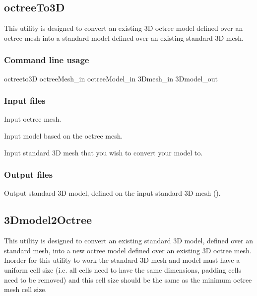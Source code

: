 \subsection{octreeTo3D}

This utility is designed to convert an existing 3D octree model defined over an octree mesh into a standard model defined over an existing standard 3D mesh.


\subsubsection{Command line usage}
\begin{fileExample}
octreeto3D octreeMesh\_in octreeModel\_in 3Dmesh\_in 3Dmodel\_out
\end{fileExample}

\subsubsection{Input files}
\begin{description}[leftmargin=5cm, style=sameline, align=left]
\item[\fileName{octreeMesh\_in}] Input octree mesh.
\item[\fileName{octreeModel\_in}] Input model based on the octree mesh.
\item[\fileName{3Dmesh\_in}] Input standard 3D mesh that you wish to convert your model to.
\end{description}

\subsubsection{Output files}
\begin{description}[leftmargin=5cm, style=sameline, align=left]
\item[\fileName{3Dmodel\_out}] Output standard 3D model, defined on the input standard 3D mesh ().
\end{description}


\subsection{3Dmodel2Octree} 

This utility is designed to convert an existing standard 3D model, defined over an standard mesh, into a new octree model defined over an existing 3D octree mesh. Inorder for this utility to work the standard 3D mesh and model must have a uniform cell size (i.e. all cells need to have the same dimensions, padding cells need to be removed) and this cell size should be the same as the minimum octree mesh cell size.


